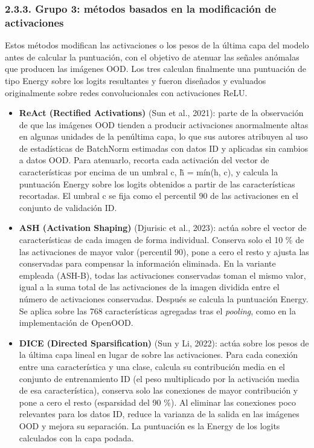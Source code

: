 \subsubsection{2.3.3. Grupo 3: métodos basados en la modificación de
activaciones}\label{grupo-3-muxe9todos-basados-en-la-modificaciuxf3n-de-activaciones}

Estos métodos modifican las activaciones o los pesos de la última capa
del modelo antes de calcular la puntuación, con el objetivo de atenuar
las señales anómalas que producen las imágenes OOD. Los tres calculan
finalmente una puntuación de tipo Energy sobre los logits resultantes y
fueron diseñados y evaluados originalmente sobre redes convolucionales
con activaciones ReLU.

\begin{itemize}
\item
  \textbf{ReAct (Rectified Activations)} (Sun et al., 2021): parte de la
  observación de que las imágenes OOD tienden a producir activaciones
  anormalmente altas en algunas unidades de la penúltima capa, lo que
  sus autores atribuyen al uso de estadísticas de BatchNorm estimadas
  con datos ID y aplicadas sin cambios a datos OOD. Para atenuarlo,
  recorta cada activación del vector de características por encima de un
  umbral c, h̃ = mín(h, c), y calcula la puntuación Energy sobre los
  logits obtenidos a partir de las características recortadas. El umbral
  c se fija como el percentil 90 de las activaciones en el conjunto de
  validación ID.
\item
  \textbf{ASH (Activation Shaping)} (Djurisic et al., 2023): actúa sobre
  el vector de características de cada imagen de forma individual.
  Conserva solo el 10 \% de las activaciones de mayor valor (percentil
  90), pone a cero el resto y ajusta las conservadas para compensar la
  información eliminada. En la variante empleada (ASH-B), todas las
  activaciones conservadas toman el mismo valor, igual a la suma total
  de las activaciones de la imagen dividida entre el número de
  activaciones conservadas. Después se calcula la puntuación Energy. Se
  aplica sobre las 768 características agregadas tras el \emph{pooling},
  como en la implementación de OpenOOD.
\item
  \textbf{DICE (Directed Sparsification)} (Sun y Li, 2022): actúa sobre
  los pesos de la última capa lineal en lugar de sobre las activaciones.
  Para cada conexión entre una característica y una clase, calcula su
  contribución media en el conjunto de entrenamiento ID (el peso
  multiplicado por la activación media de esa característica), conserva
  solo las conexiones de mayor contribución y pone a cero el resto
  (esparsidad del 90 \%). Al eliminar las conexiones poco relevantes
  para los datos ID, reduce la varianza de la salida en las imágenes OOD
  y mejora su separación. La puntuación es la Energy de los logits
  calculados con la capa podada.
\end{itemize}

